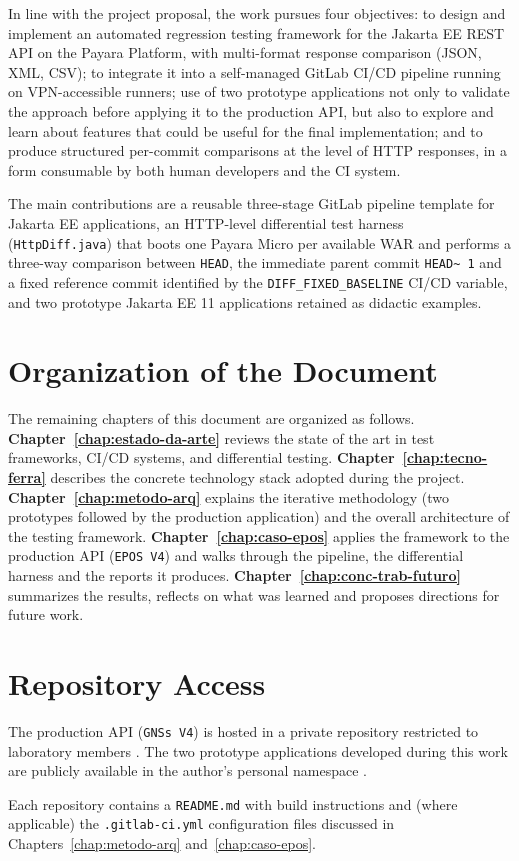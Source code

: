 In line with the project proposal, the work pursues four objectives: to design
and implement an automated regression testing framework for the Jakarta EE \ac{REST}
\ac{API} on the Payara Platform, with multi-format response comparison (\ac{JSON},
\ac{XML}, \ac{CSV}); to integrate it into a self-managed GitLab \ac{CI}/\ac{CD}
pipeline running on \ac{VPN}-accessible runners; use of two prototype
applications not only to validate the approach before applying it to the
production API, but also to explore and learn about features that could be useful
for the final implementation; and to produce structured per-commit
comparisons at the level of \ac{HTTP} responses, in a form consumable by
both human developers and the \ac{CI} system.

The main contributions are a reusable three-stage GitLab pipeline template for
Jakarta EE applications, an \ac{HTTP}-level differential test harness (\texttt{HttpDiff.java})
that boots one Payara Micro per available \ac{WAR} and performs a three-way comparison
between \texttt{HEAD}, the immediate parent commit \texttt{HEAD\textasciitilde
1} and a fixed reference commit identified by the \texttt{DIFF\_FIXED\_BASELINE}
\ac{CI}/\ac{CD} variable, and two prototype Jakarta EE 11 applications
retained as didactic examples.

\section{Organization of the Document}
\label{sec:organ}

The remaining chapters of this document are organized as follows. \textbf{Chapter~\ref{chap:estado-da-arte}}
reviews the state of the art in test frameworks, \ac{CI}/\ac{CD} systems, and
differential testing. \textbf{Chapter~\ref{chap:tecno-ferra}} describes the concrete
technology stack adopted during the project. \textbf{Chapter~\ref{chap:metodo-arq}}
explains the iterative methodology (two prototypes followed by the
production application) and the overall architecture of the testing framework.
\textbf{Chapter~\ref{chap:caso-epos}} applies the framework to the production
\ac{API} (\texttt{EPOS V4}) and walks through the pipeline, the
differential harness and the reports it produces. \textbf{Chapter~\ref{chap:conc-trab-futuro}}
summarizes the results, reflects on what was learned and proposes directions
for future work.

\section{Repository Access}
\label{sec:repos}

The production \ac{API} (\texttt{GNSs V4}) is hosted in a private
repository restricted to laboratory members \cite{repo-gnss-v4}. The two prototype
applications developed during this work are publicly available in the author's
personal namespace \cite{repo-java-ee, repo-syncspace}.

Each repository contains a \texttt{README.md} with build instructions and (where
applicable) the \texttt{.gitlab-ci.yml} configuration files discussed in Chapters~\ref{chap:metodo-arq}
and~\ref{chap:caso-epos}.